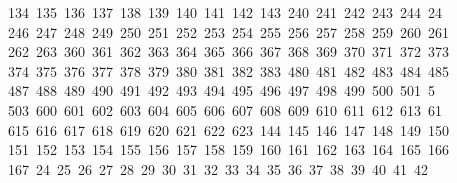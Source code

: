 \begin{tabbing}
\ 134\ 135\ 136\ 137\ 138\ 139\ 140\ 141\ 142\ 143\ 240\ 241\ 242\ 243\ 244\ 24\\[0pt]
\ 246\ 247\ 248\ 249\ 250\ 251\ 252\ 253\ 254\ 255\ 256\ 257\ 258\ 259\ 260\ 261\\[0pt]
\>\ 262\ 263\ 360\ 361\ 362\ 363\ 364\ 365\ 366\ 367\ 368\ 369\ 370\ 371\ 372\ 373\\[0pt]
\>\ 374\ 375\ 376\ 377\ 378\ 379\ 380\ 381\ 382\ 383\ 480\ 481\ 482\ 483\ 484\ 485\ \\[0pt]
\ 487\ 488\ 489\ 490\ 491\ 492\ 493\ 494\ 495\ 496\ 497\ 498\ 499\ 500\ 501\ 5\\[0pt]
\ 503\ 600\ 601\ 602\ 603\ 604\ 605\ 606\ 607\ 608\ 609\ 610\ 611\ 612\ 613\ 61\\[0pt]
\ 615\ 616\ 617\ 618\ 619\ 620\ 621\ 622\ 623\ 144\ 145\ 146\ 147\ 148\ 149\ 150\\[0pt]
\>\ 151\ 152\ 153\ 154\ 155\ 156\ 157\ 158\ 159\ 160\ 161\ 162\ 163\ 164\ 165\ 166\\[0pt]
\>\ 167\ 24\ 25\ 26\ 27\ 28\ 29\ 30\ 31\ 32\ 33\ 34\ 35\ 36\ 37\ 38\ 39\ 40\ 41\ 42\\[0pt]

\end{tabbing}
